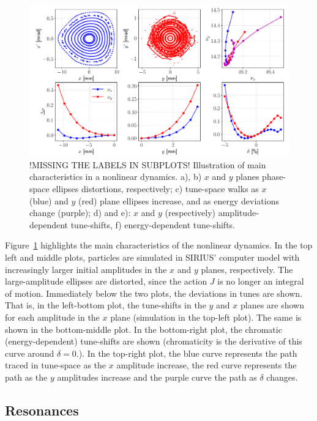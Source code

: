 \begin{figure}
    \centering
    \includegraphics[width=\textwidth]{Images/nonlinear_dynamics_phase_tunes.pdf}
    \caption[Illustration of main characteristics in a nonlinear dynamics]{!MISSING THE LABELS IN SUBPLOTS! Illustration of main characteristics in a nonlinear dynamics. a), b) $x$ and $y$ planes phase-space ellipses distortions, respectively; c) tune-space walks as $x$ (blue) and $y$ (red) plane ellipses increase, and as energy deviations change (purple); d) and e): $x$ and $y$ (respectively) amplitude-dependent tune-shifts, f) energy-dependent tune-shifts.}
    \label{fig:tune_shifts}
\end{figure}

Figure~\ref{fig:tune_shifts} highlights the main characteristics of the nonlinear dynamics. In the top left and middle plots, particles are simulated in SIRIUS' computer model with increasingly larger initial amplitudes in the $x$ and $y$ planes, respectively. The large-amplitude ellipses are distorted, since the action $J$ is no longer an integral of motion. Immediately below the two plots, the deviations in tunes are shown. That is, in the left-bottom plot, the tune-shifts in the $y$ and $x$ planes are shown for each amplitude in the $x$ plane (simulation in the top-left plot). The same is shown in the bottom-middle plot. In the bottom-right plot, the chromatic (energy-dependent) tune-shifts are shown (chromaticity is the derivative of this curve around $\delta=0$.). In the top-right plot, the blue curve represents the path traced in tune-space as the $x$ amplitude increase, the red curve represents the path as the $y$ amplitudes increase and the purple curve the path as $\delta$ changes.
\subsection{Resonances}
\label{subsec:resons}

